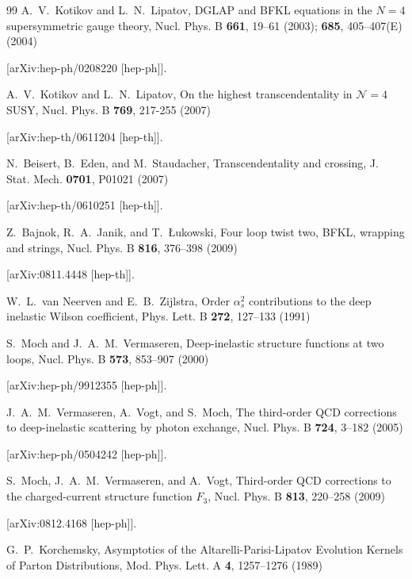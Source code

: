 \documentclass[
 twocolumn,
 superscriptaddress,
 preprintnumbers,
 nofootinbib,
 amsmath,amssymb,
 aps,
 prl
 ]{revtex4-2}
\begin{document}
\begin{thebibliography}{99}
A.~V.~Kotikov and L.~N.~Lipatov,
DGLAP and BFKL equations in the $N=4$ supersymmetric gauge theory,
Nucl. Phys. B \textbf{661}, 19--61 (2003);
\textbf{685}, 405--407(E) (2004)


[arXiv:hep-ph/0208220 [hep-ph]].



A.~V.~Kotikov and L.~N.~Lipatov,
On the highest transcendentality in $\mathcal{N}=4$ SUSY,
Nucl. Phys. B \textbf{769}, 217-255 (2007)

[arXiv:hep-th/0611204 [hep-th]].



N.~Beisert, B.~Eden, and M.~Staudacher,
Transcendentality and crossing,
J. Stat. Mech. \textbf{0701}, P01021 (2007)

[arXiv:hep-th/0610251 [hep-th]].



Z.~Bajnok, R.~A.~Janik, and T.~{\L}ukowski,
Four loop twist two, BFKL, wrapping and strings,
Nucl. Phys. B \textbf{816}, 376--398 (2009)

[arXiv:0811.4448 [hep-th]].



W.~L.~van Neerven and E.~B.~Zijlstra,
Order $\alpha_s^2$ contributions to the deep inelastic Wilson coefficient,
Phys. Lett. B \textbf{272}, 127--133 (1991)




S.~Moch and J.~A.~M.~Vermaseren,
Deep-inelastic structure functions at two loops,
Nucl. Phys. B \textbf{573}, 853--907 (2000)

[arXiv:hep-ph/9912355 [hep-ph]].



J.~A.~M.~Vermaseren, A.~Vogt, and S.~Moch,
The third-order QCD corrections to deep-inelastic scattering by photon exchange,
Nucl. Phys. B \textbf{724}, 3--182 (2005)

[arXiv:hep-ph/0504242 [hep-ph]].



S.~Moch, J.~A.~M.~Vermaseren, and A.~Vogt,
Third-order QCD corrections to the charged-current structure function $F_3$,
Nucl. Phys. B \textbf{813}, 220--258 (2009)

[arXiv:0812.4168 [hep-ph]].



G.~P.~Korchemsky,
Asymptotics of the Altarelli-Parisi-Lipatov Evolution Kernels of Parton Distributions,
Mod. Phys. Lett. A \textbf{4}, 1257--1276 (1989)





\end{thebibliography}
\end{document}
